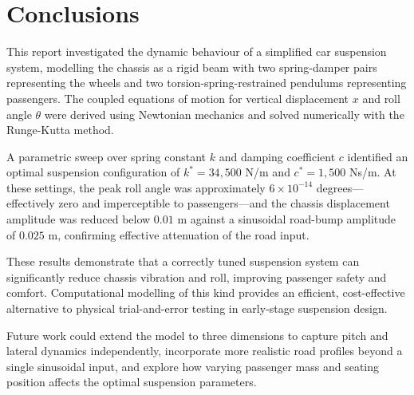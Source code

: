 \section{Conclusions}

This report investigated the dynamic behaviour of a simplified car suspension system, modelling the chassis as a rigid beam with two spring-damper pairs representing the wheels and two torsion-spring-restrained pendulums representing passengers. The coupled equations of motion for vertical displacement $x$ and roll angle $\theta$ were derived using Newtonian mechanics and solved numerically with the Runge-Kutta method.

A parametric sweep over spring constant $k$ and damping coefficient $c$ identified an optimal suspension configuration of $k^{*} = 34{,}500$ N/m and $c^{*} = 1{,}500$ Ns/m. At these settings, the peak roll angle was approximately $6 \times 10^{-14}$ degrees---effectively zero and imperceptible to passengers---and the chassis displacement amplitude was reduced below $0.01$ m against a sinusoidal road-bump amplitude of $0.025$ m, confirming effective attenuation of the road input.

These results demonstrate that a correctly tuned suspension system can significantly reduce chassis vibration and roll, improving passenger safety and comfort. Computational modelling of this kind provides an efficient, cost-effective alternative to physical trial-and-error testing in early-stage suspension design.

Future work could extend the model to three dimensions to capture pitch and lateral dynamics independently, incorporate more realistic road profiles beyond a single sinusoidal input, and explore how varying passenger mass and seating position affects the optimal suspension parameters.